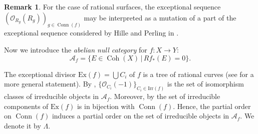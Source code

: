 \documentclass[12pt,a4paper]{amsart}
\newcommand{\f}{\varphi}
\newcommand{\oO}{{\mathcal{O}}}
\newcommand{\Coh}{\mathop{\operatorname{Coh}}\nolimits}
\newcommand{\Conn}{\mathop{\textrm{Conn}}\nolimits}
\theoremstyle{definition}
\newtheorem{REM}[LEM]{Remark}
\begin{document}
\begin{REM}
	For the case of rational surfaces, the exceptional sequence $\left(\oO_{R_g}(R_g)\right)_{g\in \Conn(f)}$ may be interpreted as a mutation of a part of the exceptional sequence considered by Hille and Perling in \cite{HilPer2}.
\end{REM}


Now we introduce the \emph{abelian null category} for $f\colon X\to Y$:
$$
\mathscr{A}_f = \{E\in \Coh(X)\,|\, Rf_*(E) =0\}.
$$

The exceptional divisor $\textrm{Ex}(f) = \bigcup C_i$ of $f$ is a tree of rational curves (see \cite[Theorem D.1]{BodBon} for a more general statement). By \cite[Theorem 7.13]{BodBon6}, $\{\oO_{C_i}(-1)\}_{C_i \in \textrm{Irr}(f)}$ is the set of isomorphism classes of irreducible objects in $\mathscr{A}_f$. Moreover, by \cite[Theorem 2.17]{BodBon2} the set of irreducible components of $\textrm{Ex}(f)$ is in bijection with $\Conn(f)$. Hence, the partial order on $\Conn(f)$ induces a partial order on the set of irreducible objects in $\mathscr{A}_f$. We denote it by $\Lambda$.



\end{document}
